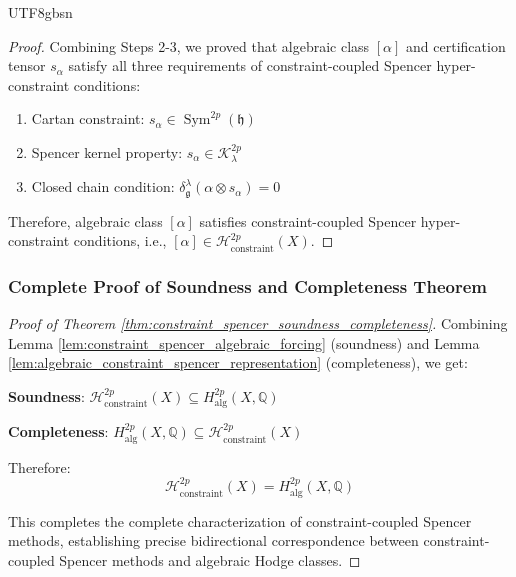 \documentclass[a4paper,12pt]{extarticle}
\theoremstyle{definition}
\begin{document}
\begin{CJK}{UTF8}{gbsn}
\begin{proof}
Combining Steps 2-3, we proved that algebraic class $[\alpha]$ and certification tensor $s_\alpha$ satisfy all three requirements of constraint-coupled Spencer hyper-constraint conditions:
\begin{enumerate}
    \item Cartan constraint: $s_\alpha \in \operatorname{Sym}^{2p}(\mathfrak{h})$ 
    \item Spencer kernel property: $s_\alpha \in \mathcal{K}^{2p}_\lambda$ 
    \item Closed chain condition: $\delta^\lambda_\mathfrak{g}(\alpha \otimes s_\alpha) = 0$ 
\end{enumerate}

Therefore, algebraic class $[\alpha]$ satisfies constraint-coupled Spencer hyper-constraint conditions, i.e., $[\alpha] \in \mathcal{H}_{\text{constraint}}^{2p}(X)$.
\end{proof}

\subsubsection{Complete Proof of Soundness and Completeness Theorem}
\label{subsubsec:complete_proof_soundness_completeness}

\begin{proof}[Proof of Theorem \ref{thm:constraint_spencer_soundness_completeness}]
Combining Lemma \ref{lem:constraint_spencer_algebraic_forcing} (soundness) and Lemma \ref{lem:algebraic_constraint_spencer_representation} (completeness), we get:

\textbf{Soundness}: $\mathcal{H}_{\text{constraint}}^{2p}(X) \subseteq H_{\text{alg}}^{2p}(X, \mathbb{Q})$

\textbf{Completeness}: $H_{\text{alg}}^{2p}(X, \mathbb{Q}) \subseteq \mathcal{H}_{\text{constraint}}^{2p}(X)$

Therefore:
\begin{equation}
\label{eq:complete_characterization_proved}
\mathcal{H}_{\text{constraint}}^{2p}(X) = H_{\text{alg}}^{2p}(X, \mathbb{Q})
\end{equation}

This completes the complete characterization of constraint-coupled Spencer methods, establishing precise bidirectional correspondence between constraint-coupled Spencer methods and algebraic Hodge classes.
\end{proof}


\end{CJK}
\end{document}
